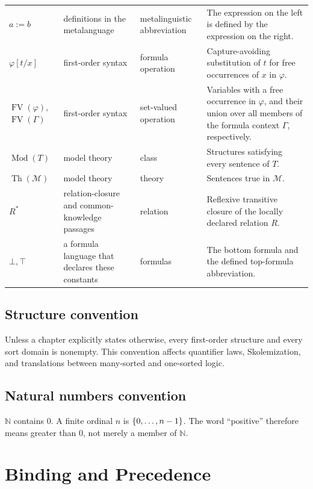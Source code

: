 \documentclass[11pt,oneside,openany]{book}
\theoremstyle{definition}
\theoremstyle{plain}
\theoremstyle{remark}
\DeclarePairedDelimiter{\set}{\lbrace}{\rbrace}
\newcommand{\N}{\mathbb{N}}
\newcommand{\FV}{\operatorname{FV}}
\newcommand{\Mod}{\operatorname{Mod}}
\newcommand{\Th}{\operatorname{Th}}
\newcommand{\bottom}{\bot}
\newcommand{\topv}{\top}
\newcommand{\defeq}{\mathrel{:=}}
\begin{document}
\begin{longtable}{@{}p{}p{}p{}p{}@{}}
\(a\defeq b\) & definitions in the metalanguage & metalinguistic abbreviation &
The expression on the left is defined by the expression on the right. \\
\(\varphi[t/x]\) & first-order syntax & formula operation & Capture-avoiding
substitution of \(t\) for free occurrences of \(x\) in \(\varphi\). \\
\(\FV(\varphi)\), \(\FV(\Gamma)\) & first-order syntax & set-valued operation &
Variables with a free occurrence in \(\varphi\), and their union over all
members of the formula context \(\Gamma\), respectively. \\
\(\Mod(T)\) & model theory & class & Structures satisfying every sentence of
\(T\). \\
\(\Th(\mathcal M)\) & model theory & theory & Sentences true in
\(\mathcal M\). \\
\(R^*\) & relation-closure and common-knowledge passages & relation & Reflexive
transitive closure of the locally declared relation \(R\). \\
\(\bottom,\topv\) & a formula language that declares these constants & formulas
& The bottom formula and the defined top-formula abbreviation. \\
\bottomrule
\end{longtable}

\section{Structure convention}
\label{sec:registered-notation-01}

Unless a chapter explicitly states otherwise, every first-order structure and
every sort domain is nonempty.  This convention affects quantifier laws,
Skolemization, and translations between many-sorted and one-sorted logic.

\section{Natural numbers convention}
\label{sec:registered-notation-02}

\(\N\) contains \(0\).  A finite ordinal \(n\) is
\(\set{0,\ldots,n-1}\).  The word ``positive'' therefore means greater
than \(0\), not merely a member of \(\N\).

\chapter{Binding and Precedence}
\label{ch:binding-precedence}
\label{app:precedence}
\end{document}
